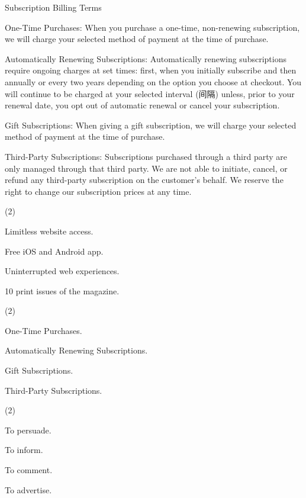 \documentclass{英语试卷}
\begin{document}
\vspace{0.4em}
\par Subscription Billing Terms\par
\par One-Time Purchases: When you purchase a one-time, non-renewing subscription, we will charge your selected method of payment at the time of purchase.\par
\par Automatically Renewing Subscriptions: Automatically renewing subscriptions require ongoing charges at set times: first, when you initially subscribe and then annually or every two years depending on the option you choose at checkout. You will continue to be charged at your selected interval (间隔) unless, prior to your renewal date, you opt out of automatic renewal or cancel your subscription.\par
\par Gift Subscriptions: When giving a gift subscription, we will charge your selected method of payment at the time of purchase.\par
\par Third-Party Subscriptions: Subscriptions purchased through a third party are only managed through that third party. We are not able to initiate, cancel, or refund any third-party subscription on the customer's behalf. We reserve the right to change our subscription prices at any time.\par
{}
\begin{choices}(2)
  \item Limitless website access.
  \item Free iOS and Android app.
  \item Uninterrupted web experiences.
  \item 10 print issues of the magazine.
\end{choices}
\begin{choices}(2)
  \item One-Time Purchases.
  \item Automatically Renewing Subscriptions.
  \item Gift Subscriptions.
  \item Third-Party Subscriptions.
\end{choices}
\begin{choices}(2)
  \item To persuade.
  \item To inform.
  \item To comment.
  \item To advertise.
\end{choices}
\end{document}
